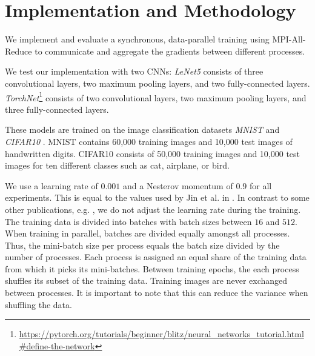 \documentclass[conference,compsoc,a4paper]{IEEEtran}
\begin{document}




\section{Implementation and Methodology} %
\label{sec:implementation}
We implement and evaluate a synchronous, data-parallel training using MPI-All-Reduce to communicate and aggregate the gradients between different processes.

We test our implementation with two CNNs:
\emph{LeNet5} \cite{lecun1998gradient} consists of three convolutional layers, two maximum pooling layers, and two fully-connected layers.
\emph{TorchNet}\footnote{\url{https://pytorch.org/tutorials/beginner/blitz/neural_networks_tutorial.html\#define-the-network}} consists of two convolutional layers, two maximum pooling layers, and three fully-connected layers.

These models are trained on the image classification datasets \emph{MNIST} \cite{lecun1998gradient} and \emph{CIFAR10} \cite{krizhevsky2009CIFAR10}.
MNIST contains 60,000 training images and 10,000 test images of handwritten digits.
CIFAR10 consists of 50,000 training images and 10,000 test images for ten different classes such as cat, airplane, or bird.

We use a learning rate of $0.001$ and a Nesterov momentum of $0.9$ for all experiments.
This is equal to the values used by Jin et al. in \cite{jin2016-How-to-scale}.
In contrast to some other publications, e.g. \cite{jin2016-How-to-scale}, we do not adjust the learning rate during the training.
%
The training data is divided into batches with batch sizes between $16$ and $512$.
When training in parallel, batches are divided equally amongst all processes.
Thus, the mini-batch size per process equals the batch size divided by the number of processes.
%
Each process is assigned an equal share of the training data from which it picks its mini-batches.
Between training epochs, the each process shuffles its subset of the training data.
Training images are never exchanged between processes.
It is important to note that this can reduce the variance when shuffling the data.
\end{document}

